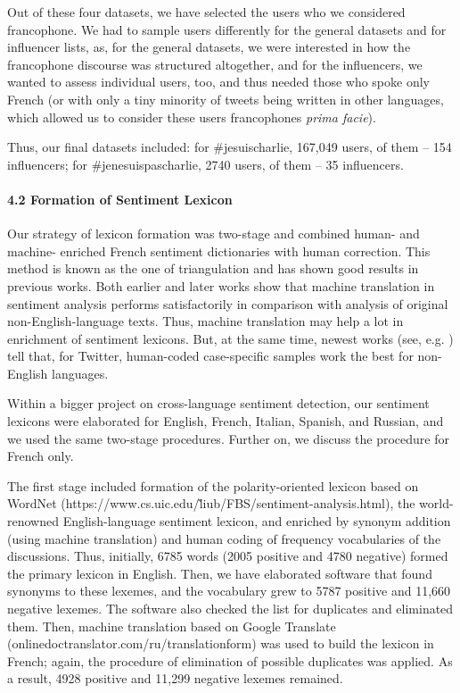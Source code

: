 Out of these four datasets, we have selected the users who we considered francophone. We had to sample users differently for the general datasets and for influencer lists, as, for the general datasets, we were interested in how the francophone discourse was structured altogether, and for the influencers, we wanted to assess individual users, too, and thus needed those who spoke only French (or with only a tiny minority of tweets being written in other languages, which allowed us to consider these users francophones \textit{prima facie}).

Thus, our final datasets included: for \#jesuischarlie, 167,049 users, of them -- 154 influencers; for \#jenesuispascharlie, 2740 users, of them -- 35 influencers.

\paragraph{4.2 Formation of Sentiment Lexicon} Our strategy of lexicon formation was two-stage and combined human- and machine- enriched French sentiment dictionaries with human correction. This method is known as the one of triangulation \cite{SteinbergerEbrahimEhrmann} and has shown good results in previous works. Both earlier \cite{BautinVijayarenuSkiena} and later \cite{AraujoReisPereira} works show that machine translation in sentiment analysis performs satisfactorily in comparison with analysis of original non-English-language texts. Thus, machine translation may help a lot in enrichment of sentiment lexicons. But, at the same time, newest works (see, e.g. \cite{MozeticGrcarSmailovic}) tell that, for Twitter, human-coded case-specific samples work the best for non-English languages.

Within a bigger project on cross-language sentiment detection, our sentiment lexicons were elaborated for English, French, Italian, Spanish, and Russian, and we used the same two-stage procedures. Further on, we discuss the procedure for French only.

The first stage included formation of the polarity-oriented lexicon based on WordNet (https://www.cs.uic.edu/\~liub/FBS/sentiment-analysis.html), the world-renowned English-language sentiment lexicon, and enriched by synonym addition (using machine translation) and human coding of frequency vocabularies of the discussions. Thus, initially, 6785 words (2005 positive and 4780 negative) formed the primary lexicon in English. Then, we have elaborated software that found synonyms to these lexemes, and the vocabulary grew to 5787 positive and 11,660 negative lexemes. The software also checked the list for duplicates and eliminated them. Then, machine translation based on Google Translate (onlinedoctranslator.com/ru/translationform) was used to build the lexicon in French; again, the procedure of elimination of possible duplicates was applied. As a result, 4928 positive and 11,299 negative lexemes remained.

